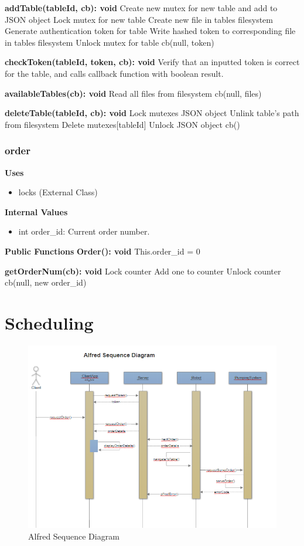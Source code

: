 \documentclass [10pt]{article}
\begin{document}
\textbf{addTable(tableId, cb): void}
Create new mutex for new table and add to JSON object
Lock mutex for new table
Create new file in tables filesystem
Generate authentication token for table
Write hashed token to corresponding file in tables filesystem
Unlock mutex for table
cb(null, token)

\textbf{checkToken(tableId, token, cb): void}
Verify that an inputted token is correct for the table, and calls callback function with boolean result.

\textbf{availableTables(cb): void}
Read all files from filesystem
cb(null, files)

\textbf{deleteTable(tableId, cb): void}
Lock mutexes JSON object
Unlink table’s path from filesystem
Delete mutexes[tableId]
Unlock JSON object
cb()

\subsubsection{order}
\textbf{Uses}
\begin{itemize}
	\item locks (External Class)
\end{itemize}

\textbf{Internal Values}
\begin{itemize}
	\item int order\_id: Current order number.
\end{itemize}

\textbf{Public Functions}
\textbf{Order(): void}
This.order\_id = 0

\textbf{getOrderNum(cb): void}
Lock counter
Add one to counter
Unlock counter
cb(null, new order\_id)


\section {Scheduling}
\begin{figure} [h!]
	\centering
	\includegraphics [scale = 0.4] {figures/Alfred_SequenceDiagram.png}
	\caption{Alfred Sequence Diagram}
\end{figure}
\end{document}
